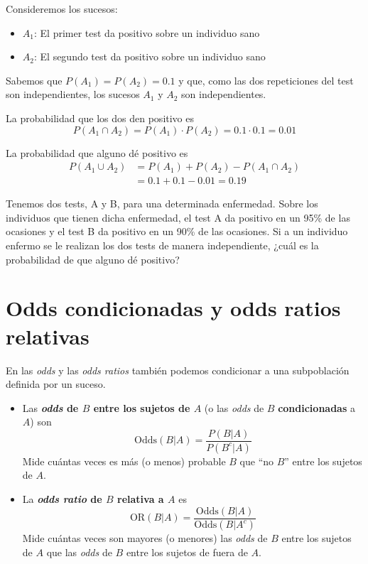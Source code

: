 \documentclass[
]{book}
\providecommand{\tightlist}{%
  \setlength{\itemsep}{0pt}\setlength{\parskip}{0pt}}
\theoremstyle{definition}
\theoremstyle{definition}
\theoremstyle{definition}
\theoremstyle{definition}
\theoremstyle{remark}
\begin{document}
Consideremos los sucesos:

\begin{itemize}
\tightlist
\item
  \(A_1\): El primer test da positivo sobre un individuo sano
\item
  \(A_2\): El segundo test da positivo sobre un individuo sano
\end{itemize}

Sabemos que \(P(A_1)=P(A_2)=0.1\) y que, como las dos repeticiones del test son independientes, los sucesos \(A_1\) y \(A_2\) son independientes.

La probabilidad que los dos den positivo es
\[
P(A_1\cap A_2) =P(A_1)\cdot P(A_2)  =0.1\cdot 0.1=0.01
\]

La probabilidad que alguno dé positivo es
\[
\begin{array}{rl}
P(A_1\cup A_2)\!\!\!\! & =P(A_1)+P(A_2)-P(A_1\cap A_2)\\
& = 0.1+0.1-0.01=0.19
\end{array}
\]

\begin{rmdexercici}
Tenemos dos tests, A y B, para una determinada enfermedad. Sobre los individuos que tienen dicha enfermedad, el test A da positivo en un 95\% de las ocasiones y el test B da positivo en un 90\% de las ocasiones.
Si a un individuo enfermo se le realizan los dos tests de manera independiente, ¿cuál es la probabilidad de que alguno dé positivo?
\end{rmdexercici}

\hypertarget{odds-condicionadas-y-odds-ratios-relativas}{%
\section{Odds condicionadas y odds ratios relativas}\label{odds-condicionadas-y-odds-ratios-relativas}}

En las \emph{odds} y las \emph{odds ratios} también podemos condicionar a una subpoblación definida por un suceso.

\begin{itemize}
\item
  Las \textbf{\emph{odds} de \(B\) entre los sujetos de \(A\)} (o las \emph{odds} de \(B\) \textbf{condicionadas} a \(A\)) son
  \[
  \text{Odds}(B|A)=\frac{P(B|A)}{P(B^c|A)}
  \]
  Mide cuántas veces es más (o menos) probable \(B\) que ``no \(B\)'' entre los sujetos de \(A\).
\item
  La \textbf{\emph{odds ratio} de \(B\) relativa a \(A\)} es
  \[
  \text{OR}(B|A)=\frac{\text{Odds}(B|A)}{\text{Odds}(B|A^c)}
  \]
  Mide cuántas veces son mayores (o menores) las \emph{odds} de \(B\) entre los sujetos de \(A\) que las \emph{odds} de \(B\) entre los sujetos de fuera de \(A\).
\end{itemize}
\end{document}
